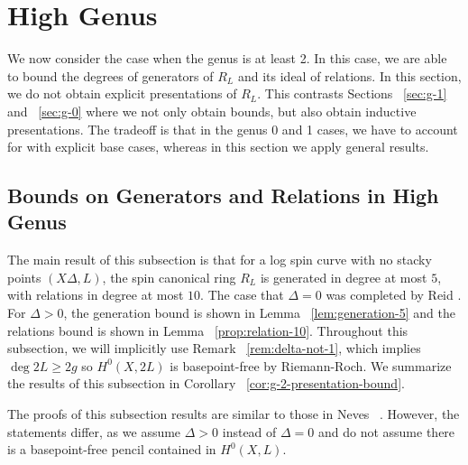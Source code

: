 \documentclass{amsart}
\theoremstyle{plain}
\newtheorem{lem}[thm]{Lemma}
\theoremstyle{definition}
\theoremstyle{remark}
\numberwithin{equation}{section}
\newcommand\ssec{\subsection}
\newcommand{\halfcan}{L}
\begin{document}

\section{High Genus}
\label{sec:g-high}
We now consider the case when the genus is at least 2. In this case, we are able to bound the degrees of generators of $R_\halfcan$ and its ideal of relations. In this section, we do not obtain explicit presentations of $R_\halfcan.$  This contrasts Sections ~\ref{sec:g-1} and ~\ref{sec:g-0} where we not only obtain bounds, but also obtain inductive presentations. The tradeoff is that in the genus 0 and 1 cases, we have to account for with explicit base cases, whereas in this section we apply general results.

\ssec{Bounds on Generators and Relations in High Genus}
\label{ssec:bounds-high-genus}

The main result of this subsection is that for a log spin curve with no stacky points $(X \Delta, L)$, the spin canonical ring $R_\halfcan$ is generated in degree at most $5$, with relations in degree at most $10$. The case that $\Delta = 0$ was completed by Reid \cite[Theorem 3.4]{reid:infinitesimal}. For $\Delta > 0$, the generation bound is shown in Lemma ~\ref{lem:generation-5} and the relations bound is shown in Lemma ~\ref{prop:relation-10}. Throughout this subsection, we will implicitly use Remark ~\ref{rem:delta-not-1}, which implies $\deg 2L \geq 2g$ so $H^0(X, 2L)$ is basepoint-free by Riemann-Roch. We summarize the results of this subsection in Corollary ~\ref{cor:g-2-presentation-bound}.

The proofs of this subsection results are similar to those in Neves ~\cite[Proposition III.4 and Proposition III.12]{neves:halfcan}. However, the statements differ, as we assume $\Delta > 0$ instead of $\Delta = 0$ and do not assume there is a basepoint-free pencil contained in $H^0(X, L).$ 

%
\end{document}
